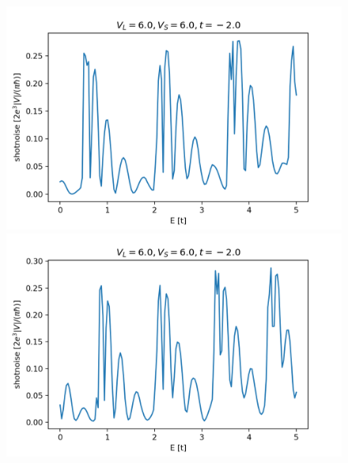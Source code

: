 \documentclass[12pt]{article}
\numberwithin{equation}{section}
\begin{document}
\begin{figure}
  \centering
  \begin{minipage}{0.333\textwidth}
      \centering
      \includegraphics[width=1.0\textwidth]{./media/shotnoise_2deg_W4_L10_VL6_0_VS6_0.png} %
  \end{minipage}\hfill
  \begin{minipage}{0.333\textwidth}
      \centering
      \includegraphics[width=1.0\textwidth]{./media/shotnoise_2deg_W5_L10_VL6_0_VS6_0.png} %
  \end{minipage}\hfill
  \begin{minipage}{0.333\textwidth}
    \centering

\end{minipage}
\end{figure}
\end{document}
